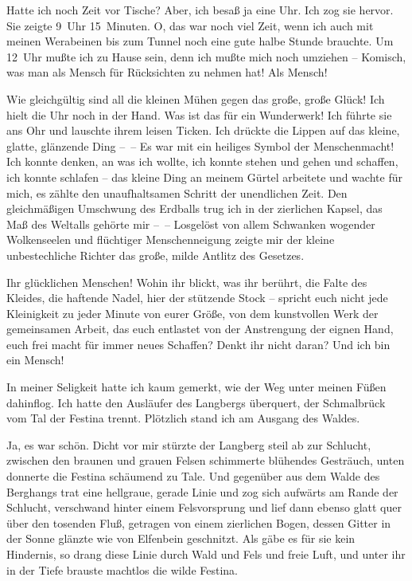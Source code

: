 Hatte ich noch Zeit vor Tische? Aber, ich besaß ja eine Uhr. Ich
zog sie hervor. Sie zeigte 9~Uhr 15~Minuten. O, das war noch viel
Zeit, wenn ich auch mit meinen Werabeinen bis zum Tunnel noch eine
gute halbe Stunde brauchte. Um 12~Uhr mußte ich zu Hause sein, denn
ich mußte mich noch umziehen – Komisch, was man als Mensch für
Rücksichten zu nehmen hat! Als Mensch!

Wie gleichgültig sind all die kleinen Mühen gegen das große, große
Glück! Ich hielt die Uhr noch in der Hand. Was ist das für ein
Wunderwerk! Ich führte sie ans Ohr und lauschte ihrem leisen
Ticken. Ich drückte die Lippen auf das kleine, glatte, glänzende
Ding –~– Es war mit ein heiliges Symbol der Menschenmacht! Ich
konnte denken, an was ich wollte, ich konnte stehen und gehen und
schaffen, ich konnte schlafen – das kleine Ding an meinem Gürtel
arbeitete und wachte für mich, es zählte den unaufhaltsamen Schritt
der unendlichen Zeit. Den gleichmäßigen Umschwung des Erdballs trug
ich in der zierlichen Kapsel, das Maß des Weltalls gehörte mir –~–
Losgelöst von allem Schwanken wogender Wolkenseelen und flüchtiger
Menschenneigung zeigte mir der kleine unbestechliche Richter das
große, milde Antlitz des Gesetzes.

Ihr glücklichen Menschen! Wohin ihr blickt, was ihr berührt, die
Falte des Kleides, die haftende Nadel, hier der stützende Stock –
spricht euch nicht jede Kleinigkeit zu jeder Minute von eurer
Größe, von dem kunstvollen Werk der gemeinsamen Arbeit, das euch
entlastet von der Anstrengung der eignen Hand, euch frei macht für
immer neues Schaffen? Denkt ihr nicht daran? Und ich bin ein
Mensch!

In meiner Seligkeit hatte ich kaum gemerkt, wie der Weg unter
meinen Füßen dahinflog. Ich hatte den Ausläufer des Langbergs
überquert, der Schmalbrück vom Tal der Festina trennt. Plötzlich
stand ich am Ausgang des Waldes.

Ja, es war schön. Dicht vor mir stürzte der Langberg steil ab zur
Schlucht, zwischen den braunen und grauen Felsen schimmerte
blühendes Gesträuch, unten donnerte die Festina schäumend zu Tale.
Und gegenüber aus dem Walde des Berghangs trat eine hellgraue,
gerade Linie und zog sich aufwärts am Rande der Schlucht,
verschwand hinter einem Felsvorsprung und lief dann ebenso glatt
quer über den tosenden Fluß, getragen von einem zierlichen Bogen,
dessen Gitter in der Sonne glänzte wie von Elfenbein geschnitzt.
Als gäbe es für sie kein Hindernis, so drang diese Linie durch Wald
und Fels und freie Luft, und unter ihr in der Tiefe brauste
machtlos die wilde Festina.

